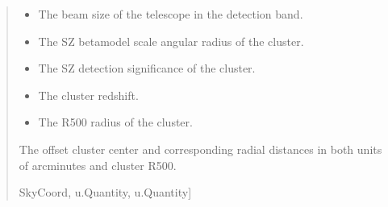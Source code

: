 \documentclass[letterpaper,12pt,english]{sphinxmanual}
\begin{document}
\begin{fulllineitems}
\begin{fulllineitems}
\begin{quote}
\begin{description}
\begin{itemize}
\item {} 
\sphinxAtStartPar
{} \textendash{} The beam size of the telescope in the detection band.

\item {} 
\sphinxAtStartPar
{} \textendash{} The SZ beta\sphinxhyphen{}model scale angular radius of the cluster.

\item {} 
\sphinxAtStartPar
{} \textendash{} The SZ detection significance of the cluster.

\item {} 
\sphinxAtStartPar
{} \textendash{} The cluster redshift.

\item {} 
\sphinxAtStartPar
{} \textendash{} The R500 radius of the cluster.

\end{itemize}

\sphinxAtStartPar
The offset cluster center and corresponding radial distances in both units of arcminutes and cluster R500.

\sphinxAtStartPar
\sphinxhref{https://docs.python.org/3/library/stdtypes.html\#tuple}{tuple}{[}SkyCoord, u.Quantity, u.Quantity{]}

\end{description}\end{quote}

\end{fulllineitems}



\end{fulllineitems}
\end{document}

